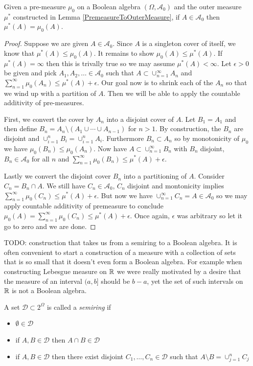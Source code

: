 \begin{lem}\label{PremeasureOuterMeasureEqual}Given a pre-measure $\mu_0$ on a Boolean algebra $(\Omega,
  \mathcal{A}_0)$ and the outer measure $\mu^*$ constructed in Lemma
  \ref{PremeasureToOuterMeasure}, if $A \in \mathcal{A}_0$ then $\mu^*(A)=\mu_0(A)$.
\end{lem}
\begin{proof}
Suppose we are given $A \in \mathcal{A}_0$.  Since $A$ is a singleton
cover of itself, we know that $\mu^*(A) \leq \mu_0(A)$.  It remains to
show $\mu_0(A) \leq \mu^*(A)$.  If $\mu^*(A) =\infty$ then this is
trivally true so we may assume $\mu^*(A) < \infty$.  Let $\epsilon
>0$ be given and pick $A_1, A_2, \dotsc \in \mathcal{A}_0$ such that
$A \subset \cup_{n=1}^\infty A_n$ and 
$\sum_{n=1}^\infty \mu_0(A_n) \leq \mu^*(A) + \epsilon$.  Our goal now
is to shrink each of the $A_n$ so that we wind up with a partition of
$A$.  Then we will be able to apply the countable additivity of pre-measures.

First, we convert the cover by $A_n$ into a disjoint cover of $A$.  Let
$B_1 = A_1$ and then define $B_n = A_n \setminus (A_1 \cup \cdots \cup
A_{n-1})$ for $n>1$.
By construction, the $B_n$ are disjoint and $\cup_{i=1}^n B_i =
\cup_{i=1}^n A_i$.  Furthermore $B_n \subset A_n$ so by monotonicity
of $\mu_0$ we have $\mu_0(B_n) \leq \mu_0(A_n)$.  Now have $A \subset
\cup_{n=1}^\infty B_n$ with $B_n$ disjoint, $B_n \in \mathcal{A}_0$
for all $n$  and $\sum_{n=1}^\infty
\mu_0(B_n) \leq \mu^*(A) + \epsilon$.  

Lastly we convert the disjoint cover $B_n$ into a partitioning of $A$.  
Consider $C_n = B_n \cap A$.  We still have $C_n \in
\mathcal{A}_0$, $C_n$ disjoint and montonicity implies $\sum_{n=1}^\infty
\mu_0(C_n) \leq \mu^*(A) + \epsilon$.  But now we have
$\cup_{n=1}^\infty C_n = A \in \mathcal{A}_0$ so we may apply
countable additivity of premeasure to conclude $\mu_0(A) = \sum_{n=1}^\infty
\mu_0(C_n) \leq \mu^*(A) + \epsilon$.  Once again, $\epsilon$ was
arbitrary so let it go to zero and we are done.
\end{proof}


TODO: construction that takes us from a semiring to a Boolean algebra.
It is often convenient to start a construction of a measure with a
collection of sets that is so small that it doesn't even form a
Boolean algebra.  For example when constructing Lebesgue measure on
$\mathbb{R}$ we were really motivated by a desire that the measure of an
interval $(a,b]$ should be $b-a$, yet the set of such intervals on
$\mathbb{R}$ is not a Boolean algebra.
\begin{defn}A set $\mathcal{D} \subset 2^\Omega$ is called a
  \emph{semiring} if 
\begin{itemize}
\item[(i)]$\emptyset \in \mathcal{D}$
\item[(ii)]if $A, B \in \mathcal{D}$ then $A \cap B \in \mathcal{D}$
\item[(iii)]if $A, B \in \mathcal{D}$ then there exist disjoint $C_1,
  \dotsc, C_n \in \mathcal{D}$ such that $A \setminus B = \cup_{j=1}^n
  C_j$
\end{itemize}
\end{defn}

